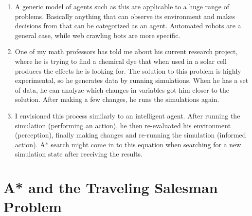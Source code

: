 \documentclass[a4paper,12pt]{article}
\begin{document}
\begin{enumerate}[]
\item A generic model of agents such as this are applicable to a huge
  range of problems. Basically anything that can observe its
  environment and makes decisions from that can be categorized as an
  agent. Automated robots are a general case, while web crawling bots
  are more specific. 
  
\item One of my math professors has told me about his current research
  project, where he is trying to find a chemical dye that when used in
  a solar cell produces the effects he is looking for. The solution to
  this problem is highly experimental, so he generates data by running
  simulations. When he has a set of data, he can analyze which changes
  in variables got him closer to the solution. After making a few
  changes, he runs the simulations again.
  
\item I envisioned this process similarly to an intelligent
  agent. After running the simulation (performing an action), he then
  re-evaluated his environment (perception), finally making changes
  and re-running the simulation (informed action). A* search might
  come in to this equation when searching for a new simulation state
  after receiving the results.
  
\end{enumerate}


\section*{A* and the Traveling Salesman Problem}
\end{document}

